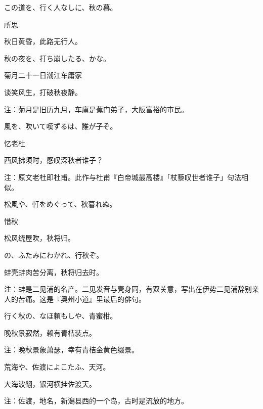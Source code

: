 \begin{haiku}
    {\FH この道を、行く人なしに、秋の暮。}

    {\FK 所思}

    {\FK 秋日黄昏，此路无行人。}
\end{haiku}

\begin{haiku}
    {\FH 秋の夜を、打ち崩したる、かな。}

    {\FK 菊月二十一日潮江车庸家}

    {\FK 谈笑风生，打破秋夜静。}

    {\FT 注：菊月是旧历九月，车庸是蕉门弟子，大阪富裕的市民。}
\end{haiku}

\begin{haiku}
    {\FH {}風を、吹いて嘆ずるは、誰が子ぞ。}

    {\FK 忆老杜}

    {\FK 西风拂须时，感叹深秋者谁子？}

    {\FT 注：原文老杜即杜甫。此作与杜甫『白帝城最高楼』「杖藜叹世者谁子」句法相似。}
\end{haiku}

\begin{haiku}
    {\FH 松風や、軒をめぐって、秋暮れぬ。}

    {\FK 惜秋}

    {\FK 松风绕屋吹，秋将归。}
\end{haiku}

\begin{haiku}
    {\FH {}の、ふたみにわかれ、行秋ぞ。}

    {\FK 蚌壳蚌肉苦分离，秋将归去时。}

    {\FT 注：蚌是二见浦的名产。二见发音与壳身同，有双关意，写出在伊势二见浦辞别亲人的苦痛。这是『奥州小道』里最后的俳句。}
\end{haiku}

\begin{haiku}
    {\FH 行く秋の、なほ頼もしや、青蜜柑。}

    {\FK 晚秋景寂然，赖有青桔装点。
    }

    {\FT 注：晚秋景象萧瑟，幸有青桔金黄色缀景。}
\end{haiku}

\begin{haiku}
    {\FH 荒海や、佐渡によこたふ、天河。}

    {\FK 大海波翻，银河横挂佐渡天。}

    {\FT 注：佐渡，地名，新潟县西的一个岛，古时是流放的地方。}
\end{haiku}

